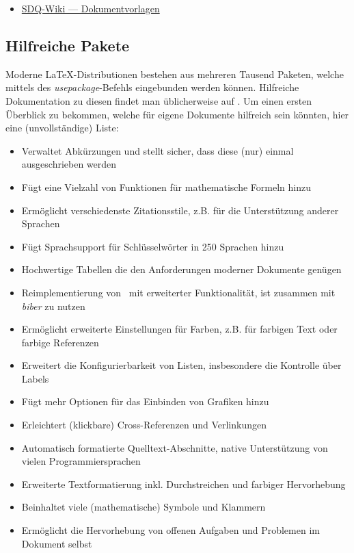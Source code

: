 \smallskip
\begin{itemize}[label={\symbolInfo}]
    \item \href{https://sdqweb.ipd.kit.edu/wiki/Dokumentvorlagen}{SDQ-Wiki --- Dokumentvorlagen}
\end{itemize}

\subsection{Hilfreiche Pakete}%
\label{sec:Schreiben:Pakete}

Moderne \LaTeX-Distributionen bestehen aus mehreren Tausend Paketen, welche mittels des \emph{usepackage}-Befehls eingebunden werden können.
Hilfreiche Dokumentation zu diesen findet man üblicherweise auf .
Um einen ersten Überblick zu bekommen, welche für eigene Dokumente hilfreich sein könnten, hier eine (unvollständige) Liste:

\smallskip
\begin{itemize}[label={\faCube}]
    \item {} Verwaltet Abkürzungen und stellt sicher, dass diese (nur) einmal ausgeschrieben werden
    \item {} Fügt eine Vielzahl von Funktionen für mathematische Formeln hinzu
    \item {} Ermöglicht verschiedenste Zitationsstile, z.B. für die Unterstützung anderer Sprachen
    \item {} Fügt Sprachsupport für Schlüsselwörter in 250 Sprachen hinzu
    \item {} Hochwertige Tabellen die den Anforderungen moderner Dokumente genügen
    \item {} Reimplementierung von \bibtex\ mit erweiterter Funktionalität, ist zusammen mit \emph{biber} zu nutzen
    \item {} Ermöglicht erweiterte Einstellungen für Farben, z.B. für farbigen Text oder farbige Referenzen
    \item {} Erweitert die Konfigurierbarkeit von Listen, insbesondere die Kontrolle über Labels
    \item {} Fügt mehr Optionen für das  Einbinden von Grafiken hinzu
    \item {} Erleichtert (klickbare) Cross-Referenzen und Verlinkungen
    \item {} Automatisch formatierte Quelltext-Abschnitte, native Unterstützung von vielen Programmiersprachen
    \item {} Erweiterte Textformatierung inkl. Durchstreichen und farbiger Hervorhebung
    \item {} Beinhaltet viele (mathematische) Symbole und Klammern
    \item {} Ermöglicht die Hervorhebung von offenen Aufgaben und Problemen im Dokument selbst
\end{itemize}
\smallskip

